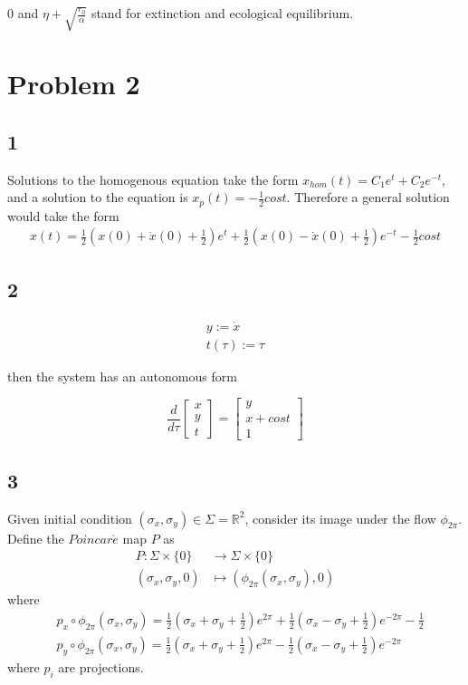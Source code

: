 \documentclass{article}
\begin{document}
$0$ and $\eta+\sqrt{\frac{r_0}{\alpha}}$ stand for extinction and ecological equilibrium.


\section*{Problem 2}



\subsection*{1}
Solutions to the homogenous equation take the form $x_{hom}(t)=C_1e^t+C_2e^{-t}$, and a solution to the equation is $x_p(t)=-\frac{1}{2}cost$. Therefore a general solution would take the form
\begin{align*}
	x(t)=\frac{1}{2}(x(0)+\dot{x}(0)+\frac{1}{2})e^t+ \frac{1}{2}(x(0)-\dot{x}(0)+\frac{1}{2}) e^{-t}-\frac{1}{2}cost
\end{align*}



\subsection*{2}
\begin{align*}
	y:=\dot{x} \\
	t(\tau):=\tau 
\end{align*}

then the system has an autonomous form 

	
	\begin{equation*}
	\frac{d}{d\tau}\left[
	\begin{array}{c}
		 x\\
		 y\\
		 t
	\end{array}
	\right]=
	\left[
	\begin{array}{c}
		 y\\
		 x+cost\\
		 1
	\end{array}
	\right]
\end{equation*}



\subsection*{3}
Given initial condition $(\sigma_x,\sigma_y)\in \Sigma=\mathbb{R}^2$, consider its image under the flow $\phi_{2\pi}$. Define the $Poincar\acute{e}$ map $P$ as 
\begin{align*}
	P:\Sigma\times\{0\}&\rightarrow\Sigma\times\{0\} \\
	(\sigma_x,\sigma_y,0)&\mapsto (\phi_{2\pi}(\sigma_x,\sigma_y),0)
\end{align*}
where
\begin{align*}
	&p_x\circ\phi_{2\pi}(\sigma_x,\sigma_y)=\frac{1}{2}(\sigma_x+\sigma_y+\frac{1}{2})e^{2\pi}+ \frac{1}{2}(\sigma_x-\sigma_y+\frac{1}{2}) e^{-2\pi}-\frac{1}{2} \\
	&p_y\circ\phi_{2\pi}(\sigma_x,\sigma_y)=\frac{1}{2}(\sigma_x+\sigma_y+\frac{1}{2})e^{2\pi}- \frac{1}{2}(\sigma_x-\sigma_y+\frac{1}{2}) e^{-2\pi}
\end{align*}
where $p_i$ are projections.
\end{document}
